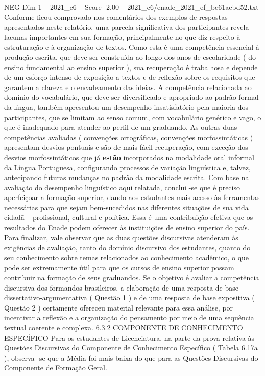 \begin{textsample}{NEG Dim 1 – 2021\_c6 – Score -2.00 – 2021\_c6/enade\_2021\_ef\_be61acbd52.txt}
Conforme ficou comprovado nos comentários dos exemplos de respostas apresentados neste relatório, uma parcela significativa dos participantes revela lacunas importantes em sua formação, principalmente no que diz respeito à estruturação e à organização de textos.
Como esta é uma competência essencial à produção escrita, que deve ser construída ao longo dos anos de escolaridade ( do ensino fundamental ao ensino superior ), sua recuperação é trabalhosa e depende de um esforço intenso de exposição a textos e de reflexão sobre os requisitos que garantem a clareza e o encadeamento das ideias.
A competência relacionada ao domínio do vocabulário, que deve ser diversificado e apropriado ao padrão formal da língua, também apresentou um desempenho insatisfatório pela maioria dos participantes, que se limitam ao senso comum, com vocabulário genérico e vago, o que é inadequado para atender ao perfil de um graduando.
As outras duas competências avaliadas ( convenções ortográficas, convenções morfossintáticas ) apresentam desvios pontuais e são de mais fácil recuperação, com exceção dos desvios morfossintáticos que já \textbf{estão} incorporados na modalidade oral informal da Língua Portuguesa, configurando processos de variação linguística e, talvez, antecipando futuras mudanças no padrão da modalidade escrita.
Com base na avaliação do desempenho linguístico aqui relatada, conclui -se que é preciso aperfeiçoar a formação superior, dando aos estudantes mais acesso às ferramentas necessárias para que sejam bem-sucedidos nas diferentes situações de sua vida cidadã – profissional, cultural e política.
Essa é uma contribuição efetiva que os resultados do Enade podem oferecer às instituições de ensino superior do país.
Para finalizar, vale observar que as duas questões discursivas atenderam às exigências de avaliação, tanto do domínio discursivo dos estudantes, quanto do seu conhecimento sobre temas relacionados ao conhecimento acadêmico, o que pode ser extremamente útil para que os cursos de ensino superior possam contribuir na formação de seus graduandos.
Se o objetivo é avaliar a competência discursiva dos formandos brasileiros, a elaboração de uma resposta de base dissertativo-argumentativa ( Questão 1 ) e de uma resposta de base expositiva ( Questão 2 ) certamente ofereceu material relevante para essa análise, por incentivar a reflexão e a organização do pensamento por meio de uma sequência textual coerente e complexa. 6.3.2 COMPONENTE DE CONHECIMENTO ESPECÍFICO Para os estudantes de Licenciatura, na parte da prova relativa às Questões Discursivas do Componente de Conhecimento Específico ( Tabela 6.17a ), observa -se que a Média foi mais baixa do que para as Questões Discursivas do Componente de Formação Geral.

\end{textsample}
